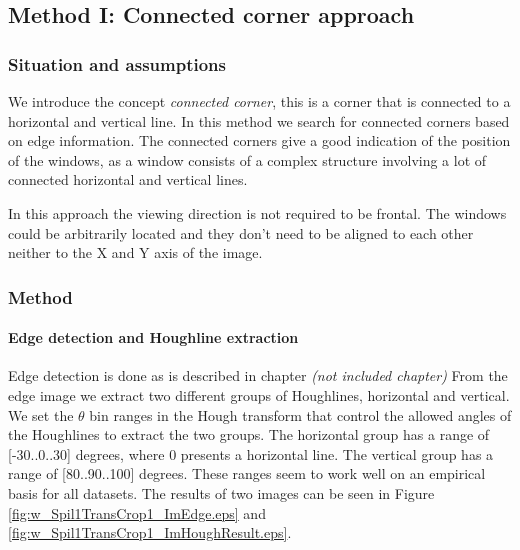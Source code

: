 





\subsection{Method I: Connected corner approach} 


\subsubsection{Situation and assumptions}
We introduce the concept \emph{connected corner}, this is a corner that is 
connected to a horizontal and vertical line.  
In this method we search for connected corners based on edge information.
The connected corners give a good indication of the position of the windows, as 
a window consists of a complex structure involving a lot of connected horizontal
and vertical lines. 

In this approach the viewing direction is not required to be frontal.
The windows could be arbitrarily located and they don't need
to be aligned to each other neither to the X and Y axis of the image.


\subsubsection{Method}
\paragraph{Edge detection and Houghline extraction}
Edge detection is done as is described in chapter 
\emph{(not included chapter)} %
From the edge image we extract two different groups of Houghlines, horizontal and %
vertical.  We set the $\theta$ bin ranges in the Hough transform that control the
allowed angles of the Houghlines to extract the two groups. The horizontal group
has a range of [-30..0..30] degrees, where 0 presents a horizontal line. The vertical
group has a range of [80..90..100] degrees. These ranges seem
to work well on an empirical basis for all datasets.
The results of two images can be seen in Figure \ref{fig:w_Spil1TransCrop1_ImEdge.eps} and
 \ref{fig:w_Spil1TransCrop1_ImHoughResult.eps}.

